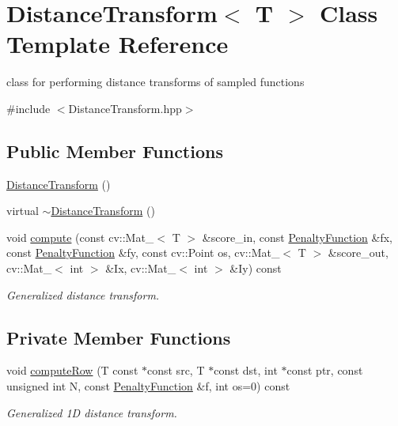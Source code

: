 \hypertarget{classDistanceTransform}{\section{\-Distance\-Transform$<$ \-T $>$ \-Class \-Template \-Reference}
\label{classDistanceTransform}
}


class for performing distance transforms of sampled functions  




{\ttfamily \#include $<$\-Distance\-Transform.\-hpp$>$}

\subsection*{\-Public \-Member \-Functions}
\begin{DoxyCompactItemize}
\item 
\hyperlink{classDistanceTransform_ae6c06d78413d63dff5abdc8abd44499d}{\-Distance\-Transform} ()
\item 
virtual \hyperlink{classDistanceTransform_ada481afc2685e2e52b9c51ed4950ad60}{$\sim$\-Distance\-Transform} ()
\item 
void \hyperlink{classDistanceTransform_a973ae7b0b971b4c5d5a07e56ec6ea31d}{compute} (const cv\-::\-Mat\-\_\-$<$ \-T $>$ \&score\-\_\-in, const \hyperlink{classPenaltyFunction}{\-Penalty\-Function} \&fx, const \hyperlink{classPenaltyFunction}{\-Penalty\-Function} \&fy, const cv\-::\-Point os, cv\-::\-Mat\-\_\-$<$ \-T $>$ \&score\-\_\-out, cv\-::\-Mat\-\_\-$<$ int $>$ \&\-Ix, cv\-::\-Mat\-\_\-$<$ int $>$ \&\-Iy) const 
\begin{DoxyCompactList}\small\item\em \-Generalized distance transform. \end{DoxyCompactList}\end{DoxyCompactItemize}
\subsection*{\-Private \-Member \-Functions}
\begin{DoxyCompactItemize}
\item 
void \hyperlink{classDistanceTransform_a67cc53dc7aa6b93e931d2317208248ba}{compute\-Row} (\-T const $\ast$const src, \-T $\ast$const dst, int $\ast$const ptr, const unsigned int \-N, const \hyperlink{classPenaltyFunction}{\-Penalty\-Function} \&f, int os=0) const 
\begin{DoxyCompactList}\small\item\em \-Generalized 1\-D distance transform. \end{DoxyCompactList}\end{DoxyCompactItemize}


